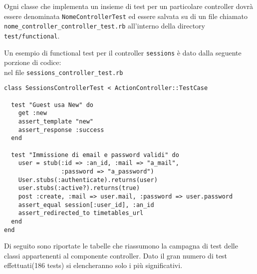 \documentclass[11pt,a4paper]{article}
\begin{document}
Ogni classe che implementa un insieme di test per un particolare controller dovrà essere denominata \verb|NomeControllerTest| ed essere salvata su di un file chiamato \verb|nome_controller_controller_test.rb| all'interno della directory \verb|test/functional|.

Un esempio di functional test per il controller \verb|sessions| è dato dalla seguente porzione di codice: \\
nel file \verb|sessions_controller_test.rb|
\begin{verbatim}
class SessionsControllerTest < ActionController::TestCase

  test "Guest usa New" do
    get :new
    assert_template "new"
    assert_response :success
  end

  test "Immissione di email e password validi" do
    user = stub(:id => :an_id, :mail => "a_mail",
                :password => "a_password")
    User.stubs(:authenticate).returns(user)
    user.stubs(:active?).returns(true)
    post :create, :mail => user.mail, :password => user.password
    assert_equal session[:user_id], :an_id
    assert_redirected_to timetables_url
  end
end
\end{verbatim}

Di seguito sono riportate le tabelle che riassumono la campagna di test delle classi appartenenti al componente controller. 
Dato il gran numero di test effettuati(186 tests) si elencheranno solo i più significativi.
\end{document}

